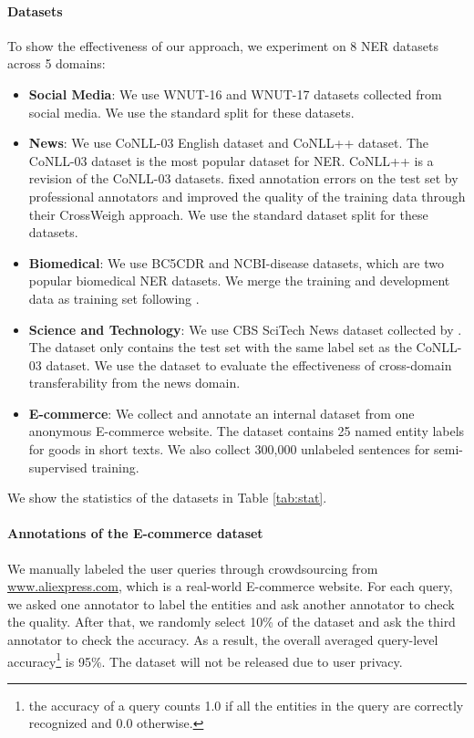 \paragraph{Datasets} To show the effectiveness of our approach, we experiment on 8 NER datasets across 5 domains:
\begin{itemize}[leftmargin=*]
    \item {\bf Social Media}: We use WNUT-16 \citep{strauss-etal-2016-results} and WNUT-17 \citep{derczynski-etal-2017-results} datasets collected from social media. We use the standard split for these datasets.
    \item {\bf News}: We use CoNLL-03 English \cite{tjong-kim-sang-de-meulder-2003-introduction} dataset and CoNLL++ \citep{wang-etal-2019-crossweigh} dataset. The CoNLL-03 dataset is the most popular dataset for NER. CoNLL++ is a revision of the CoNLL-03 datasets. \citet{wang-etal-2019-crossweigh} fixed annotation errors on the test set by professional annotators and improved the quality of the training data through their CrossWeigh approach. We use the standard dataset split for these datasets.
    \item {\bf Biomedical}: We use BC5CDR \citep{li2016biocreative} and NCBI-disease \citep{dougan2014ncbi} datasets, which are two popular biomedical NER datasets. We merge the training and development data as training set following \citet{nooralahzadeh-etal-2019-reinforcement}.
    \item {\bf Science and Technology}: We use CBS SciTech News dataset collected by \citet{jia-etal-2019-cross}. The dataset only contains the test set with the same label set as the CoNLL-03 dataset. We use the dataset to evaluate the effectiveness of cross-domain transferability from the news domain.
    \item {\bf E-commerce}: %
    We collect and annotate an internal dataset from one anonymous E-commerce website. The dataset contains 25 named entity labels for goods in short texts. We also collect 300,000 unlabeled sentences for semi-supervised training.
\end{itemize}
We show the statistics of the datasets in Table \ref{tab:stat}.

\paragraph{Annotations of the E-commerce dataset}
We manually labeled the user queries through crowdsourcing from \url{www.aliexpress.com}, which is a real-world E-commerce website. For each query, we asked one annotator to label the entities and ask another annotator to check the quality. After that, we randomly select 10\% of the dataset and ask the third annotator to check the accuracy. As a result, the overall averaged query-level accuracy\footnote{the accuracy of a query counts 1.0 if all the entities in the query are correctly recognized and 0.0 otherwise.} is 95\%. The dataset will not be released due to user privacy.

